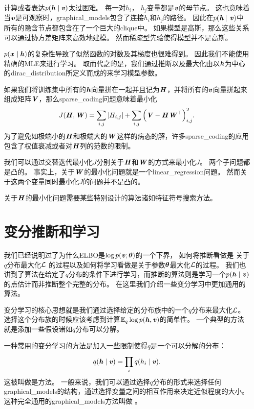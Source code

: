 计算或者表达$p(\boldsymbol{\mathit{h}}\mid\boldsymbol{\mathit{v}})$太过困难。
每一对$h_i$， $h_j$变量都是$\boldsymbol{\mathit{v}}$的母节点。
这也意味着当$\boldsymbol{\mathit{v}}$是可观察时，\gls{graphical_models}包含了连接$h_i$和$h_j$的路径。
因此在$p(\boldsymbol{\mathit{h}} \mid\boldsymbol{\mathit{v}})$中所有的隐含节点都包含在了一个巨大的\gls{clique}中。
如果模型是高斯，那么这些关系可以通过协方差矩阵来高效地建模。
然而稀疏型先验使得模型并不是高斯。



$p(\boldsymbol{\mathit{x}}\mid\boldsymbol{\mathit{h}})$的复杂性导致了似然函数的对数及其梯度也很难得到。
因此我们不能使用精确的\gls{MLE}来进行学习。
取而代之的是，我们通过推断以及最大化由以$\boldsymbol{\mathit{h}}$为中心的\gls{dirac_distribution}所定义而成的来学习模型参数。


如果我们将训练集中所有的$\boldsymbol{\mathit{h}}$向量拼在一起并且记为$\boldsymbol{\mathit{H}}$，并将所有的$\boldsymbol{\mathit{v}}$向量拼起来组成矩阵$\boldsymbol{\mathit{V}}$，那么\gls{sparse_coding}问题意味着最小化
\begin{align}
	J(\boldsymbol{\mathit{H}},\boldsymbol{\mathit{W}}) = \sum_{i,j}^{}\vert H_{i,j}\vert + \sum_{i,j}^{}\Big(\boldsymbol{\mathit{V}} - \boldsymbol{\mathit{H}} \boldsymbol{\mathit{W}}^{\top}\Big)^2_{i,j}.
\end{align}
为了避免如极端小的$\boldsymbol{\mathit{H}}$和极端大的$\boldsymbol{\mathit{W}}$这样的病态的解，许多\gls{sparse_coding}的应用包含了权值衰减或者对$\boldsymbol{\mathit{H}}$列的范数的限制。


我们可以通过交替迭代最小化$J$分别关于$\boldsymbol{\mathit{H}}$和$\boldsymbol{\mathit{W}}$的方式来最小化$J$。
两个子问题都是凸的。
事实上，关于$\boldsymbol{\mathit{W}}$的最小化问题就是一个\gls{linear_regression}问题。
然而关于这两个变量同时最小化$J$的问题并不是凸的。


关于$\boldsymbol{\mathit{H}}$的最小化问题需要某些特别设计的算法诸如特征符号搜索方法\citep{HonglakLee-2007}。


\section{变分推断和学习}
\label{sec:variational_inference_and_learning}


我们已经说明过了为什么\gls{ELBO}是$\log  p(\boldsymbol{\mathit{v}};\boldsymbol{\theta})$的一个下界， 如何将推断看做是 关于$q$分布最大化$\mathcal{L}$ 的过程以及如何将学习看做是关于参数$\boldsymbol{\theta}$最大化$\mathcal{L}$的过程。
我们也讲到了算法在给定了$q$分布的条件下进行学习，而推断的算法则是学习一个$p(\boldsymbol{\mathit{h}} \mid \boldsymbol{\mathit{v}})$的点估计而非推断整个完整的分布。
在这里我们介绍一些变分学习中更加通用的算法。


变分学习的核心思想就是我们通过选择给定的分布族中的一个$q$分布来最大化$\mathcal{L}$。
选择这个分布族的时候应该考虑到计算$\mathbb{E}_q \log p(\boldsymbol{\mathit{h}},\boldsymbol{\mathit{v}})$的简单性。
一个典型的方法就是添加一些假设诸如$q$分布可以分解。


一种常用的变分学习的方法是加入一些限制使得$q$是一个可以分解的分布：
\begin{align}
	q(\boldsymbol{\mathit{h}}\mid\boldsymbol{\mathit{v}}) = \prod_{i}^{}q(h_i \mid \boldsymbol{\mathit{v}}).
\end{align}
这被叫做是方法。
一般来说，我们可以通过选择$q$分布的形式来选择任何\gls{graphical_models}的结构，通过选择变量之间的相互作用来决定近似程度的大小。
这种完全通用的\gls{graphical_models}方法叫做 \citep{Saul96}。


